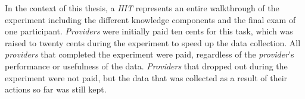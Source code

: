 In the context of this thesis, a \emph{HIT} represents an entire walkthrough of
the experiment including the different knowledge components and the final exam
of one participant. \emph{Providers} were initially paid ten cents for this task,
which was raised to twenty cents during the experiment to speed up the data
collection. All \emph{providers} that completed the experiment were paid,
regardless of the \emph{provider}'s performance or usefulness of the data.
\emph{Providers} that dropped out during the experiment were not paid, but the data
that was collected as a result of their actions so far was still kept.
